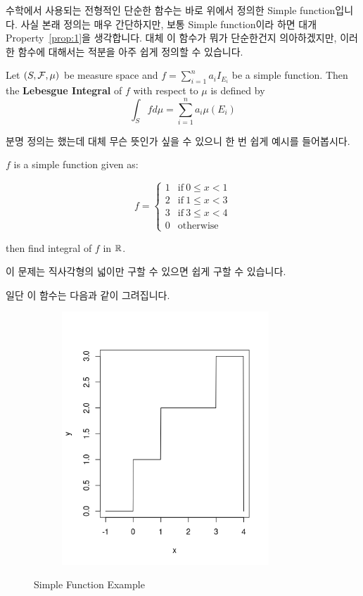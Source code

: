 \documentclass[final]{IEEEphot}
\begin{document}
수학에서 사용되는 전형적인 단순한 함수는 바로 위에서 정의한 Simple function입니다. 사실 본래 정의는 매우 간단하지만, 보통 Simple function이라 하면 대개 Property~\ref{prop:1}을 생각합니다. 대체 이 함수가 뭐가 단순한건지 의아하겠지만, 이러한 함수에 대해서는 적분을 아주 쉽게 정의할 수 있습니다.

\begin{definition}
	Let $(S,\mathcal{F}, \mu)$ be measure space and $\displaystyle f = \sum_{i=1}^{n}a_i I_{E_i}$ be a simple function. Then the \textbf{Lebesgue Integral} of $f$ with respect to $\mu$ is defined by
	$$ \int_S f d\mu = \sum_{i=1}^{n}a_i \mu(E_i)$$
	
	\HL
\end{definition}

분명 정의는 했는데 대체 무슨 뜻인가 싶을 수 있으니 한 번 쉽게 예시를 들어봅시다.

\begin{example}
	$f$ is a simple function given as:
	
	$$ f =
	\begin{cases}
		1 & \text{if}~ 0 \leq x < 1 \\
		2 & \text{if}~ 1 \leq x < 3 \\
		3 & \text{if}~ 3 \leq x < 4 \\
		0 & \text{otherwise}
	\end{cases}
	$$
	
	then find integral of $f$ in $\mathbb{R}$.
	
	\HL
\end{example}

이 문제는 직사각형의 넓이만 구할 수 있으면 쉽게 구할 수 있습니다.

\newpage

일단 이 함수는 다음과 같이 그려집니다.

\begin{figure}[h!]
	\centering
	\begin{subfigure}{.6\textwidth}
		\centering
		\includegraphics[width=\textwidth, height=9.5cm]{simple.png}
	\end{subfigure}
	\caption{Simple Function Example}
\end{figure}
\end{document}
